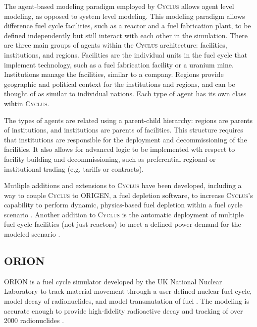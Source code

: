 \documentclass{article}
\newcommand{\Cyclus}{\textsc{Cyclus}\xspace}%
\begin{document}
    The agent-based modeling paradigm employed by \Cyclus allows agent level 
    modeling, as opposed to system level modeling. This modeling paradigm 
    allows difference 
    fuel cycle facilities, such as a reactor and a fuel fabrication plant, to 
    be defined independently but still interact with each other in the 
    simulation. There are three main groups of agents within the \Cyclus 
    architecture: facilities, institutions, and regions. Facilities are 
    the individual units in the fuel cycle that implement technology, 
    such as a fuel fabrication facility or a uranium mine. Institutions 
    manage the facilities, similar to a company. Regions provide geographic 
    and political context for the institutions and regions, and can be thought 
    of as similar to individual nations. Each type of agent has its own 
    class wihtin \Cyclus. 

    The types of agents are related using a parent-child hierarchy: regions are
    parents of institutions, and institutions are parents of facilities. This 
    structure requires that institutions are responsible for the deployment 
    and decommissioning of the facilities. It also allows for advanced logic 
    to be implemented wth respect to facility building and decommissioning, 
    such as preferential regional or institutional trading (e.g. tariffs or 
    contracts). 

    Mutliple additions and extensions to \Cyclus have been developed, including 
    a way to couple \Cyclus to ORIGEN, a fuel depletion software, to increase
    \Cyclus's capability to perform dynamic, physics-based fuel depletion 
    within a fuel cycle scenario \cite{skutnik_cyborg:_2016}. Another 
    addition to \Cyclus is the automatic deployment of multiple fuel 
    cycle facilities (not just reactors) to meet a defined power demand 
    for the modeled scenario \cite{chee_demand-driven_2020}.    

\subsection{ORION}
    ORION is a fuel cycle simulator developed by the UK National Nuclear 
    Laboratory to track material movement through a user-defined nuclear 
    fuel cycle, model decay of radionuclides, and model transmutation of fuel
    \cite{gregg_analysis_2012}. The modeling is accurate enough to provide 
    high-fidelity radioactive decay and tracking of over 2000 radionuclides
    \cite{feng_standardized_2016}. 
    
\end{document}
